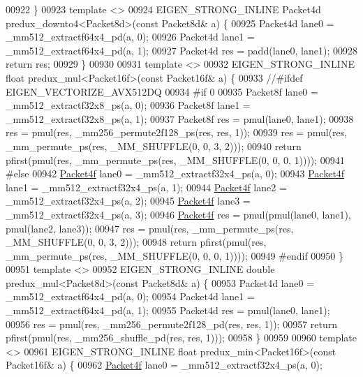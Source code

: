 \begin{DoxyCode}
00922 \}
00923 \textcolor{keyword}{template} <>
00924 EIGEN\_STRONG\_INLINE Packet4d predux\_downto4<Packet8d>(\textcolor{keyword}{const} Packet8d& a) \{
00925   Packet4d lane0 = \_mm512\_extractf64x4\_pd(a, 0);
00926   Packet4d lane1 = \_mm512\_extractf64x4\_pd(a, 1);
00927   Packet4d res = padd(lane0, lane1);
00928   \textcolor{keywordflow}{return} res;
00929 \}
00930 
00931 \textcolor{keyword}{template} <>
00932 EIGEN\_STRONG\_INLINE \textcolor{keywordtype}{float} predux\_mul<Packet16f>(\textcolor{keyword}{const} Packet16f& a) \{
00933 \textcolor{comment}{//#ifdef EIGEN\_VECTORIZE\_AVX512DQ}
00934 \textcolor{preprocessor}{#if 0}
00935   Packet8f lane0 = \_mm512\_extractf32x8\_ps(a, 0);
00936   Packet8f lane1 = \_mm512\_extractf32x8\_ps(a, 1);
00937   Packet8f res = pmul(lane0, lane1);
00938   res = pmul(res, \_mm256\_permute2f128\_ps(res, res, 1));
00939   res = pmul(res, \_mm\_permute\_ps(res, \_MM\_SHUFFLE(0, 0, 3, 2)));
00940   \textcolor{keywordflow}{return} pfirst(pmul(res, \_mm\_permute\_ps(res, \_MM\_SHUFFLE(0, 0, 0, 1))));
00941 \textcolor{preprocessor}{#else}
00942   \hyperlink{struct_eigen_1_1internal_1_1_packet4f}{Packet4f} lane0 = \_mm512\_extractf32x4\_ps(a, 0);
00943   \hyperlink{struct_eigen_1_1internal_1_1_packet4f}{Packet4f} lane1 = \_mm512\_extractf32x4\_ps(a, 1);
00944   \hyperlink{struct_eigen_1_1internal_1_1_packet4f}{Packet4f} lane2 = \_mm512\_extractf32x4\_ps(a, 2);
00945   \hyperlink{struct_eigen_1_1internal_1_1_packet4f}{Packet4f} lane3 = \_mm512\_extractf32x4\_ps(a, 3);
00946   \hyperlink{struct_eigen_1_1internal_1_1_packet4f}{Packet4f} res = pmul(pmul(lane0, lane1), pmul(lane2, lane3));
00947   res = pmul(res, \_mm\_permute\_ps(res, \_MM\_SHUFFLE(0, 0, 3, 2)));
00948   \textcolor{keywordflow}{return} pfirst(pmul(res, \_mm\_permute\_ps(res, \_MM\_SHUFFLE(0, 0, 0, 1))));
00949 \textcolor{preprocessor}{#endif}
00950 \}
00951 \textcolor{keyword}{template} <>
00952 EIGEN\_STRONG\_INLINE \textcolor{keywordtype}{double} predux\_mul<Packet8d>(\textcolor{keyword}{const} Packet8d& a) \{
00953   Packet4d lane0 = \_mm512\_extractf64x4\_pd(a, 0);
00954   Packet4d lane1 = \_mm512\_extractf64x4\_pd(a, 1);
00955   Packet4d res = pmul(lane0, lane1);
00956   res = pmul(res, \_mm256\_permute2f128\_pd(res, res, 1));
00957   \textcolor{keywordflow}{return} pfirst(pmul(res, \_mm256\_shuffle\_pd(res, res, 1)));
00958 \}
00959 
00960 \textcolor{keyword}{template} <>
00961 EIGEN\_STRONG\_INLINE \textcolor{keywordtype}{float} predux\_min<Packet16f>(\textcolor{keyword}{const} Packet16f& a) \{
00962   \hyperlink{struct_eigen_1_1internal_1_1_packet4f}{Packet4f} lane0 = \_mm512\_extractf32x4\_ps(a, 0);

\end{DoxyCode}
